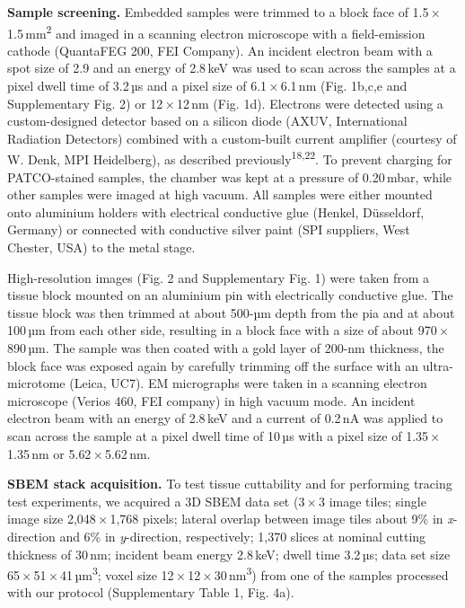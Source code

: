 \documentclass{article}
\begin{document}
\textbf{Sample screening.} Embedded samples were trimmed to a block face of 1.5\,×\,1.5\,mm\textsuperscript{2} and imaged in a scanning electron microscope with a field-emission cathode (QuantaFEG 200, FEI Company). An incident electron beam with a spot size of 2.9 and an energy of 2.8\,keV was used to scan across the samples at a pixel dwell time of 3.2\,µs and a pixel size of 6.1\,×\,6.1\,nm (Fig. 1b,c,e and Supplementary Fig. 2) or 12\,×\,12\,nm (Fig. 1d). Electrons were detected using a custom-designed detector based on a silicon diode (AXUV, International Radiation Detectors) combined with a custom-built current amplifier (courtesy of W. Denk, MPI Heidelberg), as described previously\textsuperscript{18,22}. To prevent charging for PATCO-stained samples, the chamber was kept at a pressure of 0.20\,mbar, while other samples were imaged at high vacuum. All samples were either mounted onto aluminium holders with electrical conductive glue (Henkel, Düsseldorf, Germany) or connected with conductive silver paint (SPI suppliers, West Chester, USA) to the metal stage.

High-resolution images (Fig. 2 and Supplementary Fig. 1) were taken from a tissue block mounted on an aluminium pin with electrically conductive glue. The tissue block was then trimmed at about 500-µm depth from the pia and at about 100\,µm from each other side, resulting in a block face with a size of about 970\,×\,890\,µm. The sample was then coated with a gold layer of 200-nm thickness, the block face was exposed again by carefully trimming off the surface with an ultra-microtome (Leica, UC7). EM micrographs were taken in a scanning electron microscope (Verios 460, FEI company) in high vacuum mode. An incident electron beam with an energy of 2.8\,keV and a current of 0.2\,nA was applied to scan across the sample at a pixel dwell time of 10\,µs with a pixel size of 1.35\,×\,1.35\,nm or 5.62\,×\,5.62\,nm.

\textbf{SBEM stack acquisition.} To test tissue cuttability and for performing tracing test experiments, we acquired a 3D SBEM data set (3\,×\,3 image tiles; single image size 2,048\,×\,1,768 pixels; lateral overlap between image tiles about 9\% in \emph{x}-direction and 6\% in \emph{y}-direction, respectively; 1,370 slices at nominal cutting thickness of 30\,nm; incident beam energy 2.8\,keV; dwell time 3.2\,µs; data set size 65\,×\,51\,×\,41\,µm\textsuperscript{3}; voxel size 12\,×\,12\,×\,30\,nm\textsuperscript{3}) from one of the samples processed with our protocol (Supplementary Table 1, Fig. 4a).
\end{document}
